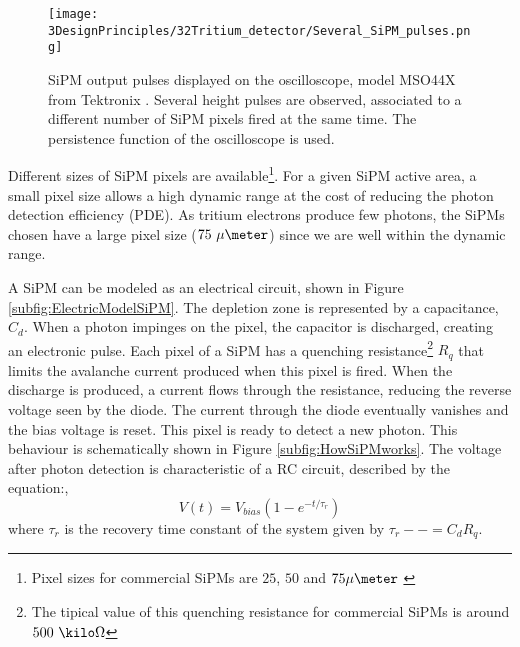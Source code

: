 \begin{figure}[h]
\centering
\texttt{[image: 3DesignPrinciples/32Tritium\_detector/Several\_SiPM\_pulses.png]}
\caption{SiPM output pulses displayed on the oscilloscope, model MSO44X from Tektronix \cite{Oscilloscope}. Several height pulses are observed, associated to a different number of  SiPM pixels fired at the same time. The persistence function of the oscilloscope is used.\label{fig:PulsesOfSiPM}}
\end{figure}

Different sizes of SiPM pixels are available\footnote{Pixel sizes for commercial SiPMs are $25$, $50$ and $75\mu\meter$ \cite{DataSheetHammamatsu_1_SiPM_25, DataSheetHammamatsu_1_SiPM_50, DataSheetHammamatsu_1_SiPM_75}}. For a given SiPM active area, a small pixel size allows a high dynamic range at the cost of reducing the photon detection efficiency (PDE). As tritium electrons produce few photons, the SiPMs chosen have a large pixel size ($75~\mu\meter$) since we are well within the dynamic range.


A SiPM can be modeled as an electrical circuit, shown in Figure \ref{subfig:ElectricModelSiPM}. The depletion zone is represented by a capacitance, $C_d$. When a photon impinges on the pixel, the capacitor is discharged, creating an electronic pulse. Each pixel of a SiPM has a quenching resistance\footnote{The tipical value of this quenching resistance for commercial SiPMs is around $500~\kilo\Omega$} $R_q$ that limits the avalanche current produced when this pixel is fired. When the discharge is produced, a current flows through the resistance, reducing the reverse voltage seen by the diode. The current through the diode eventually vanishes and the bias voltage is reset. This pixel is ready to detect a new photon. This behaviour is schematically shown in Figure \ref{subfig:HowSiPMworks}. The voltage after photon detection is characteristic of a RC circuit, described by the equation:,
\begin{equation}
V(t)=V_{bias}\left(1-e^{-t/\tau_r} \right)
\label{RCCircuitBiasVoltage}
\end{equation}
where $\tau_r$ is the recovery time constant of the system given by $\tau_r--=C_d R_q$.

